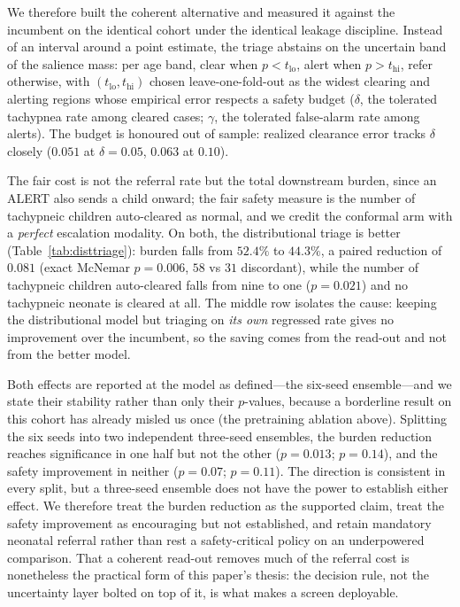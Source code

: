 We therefore built the coherent alternative and measured it against the incumbent on the identical
cohort under the identical leakage discipline. Instead of an interval around a point estimate, the
triage abstains on the uncertain band of the salience mass: per age band, clear when $p<t_\text{lo}$,
alert when $p>t_\text{hi}$, refer otherwise, with $(t_\text{lo},t_\text{hi})$ chosen leave-one-fold-out
as the widest clearing and alerting regions whose empirical error respects a safety budget ($\delta$, the
tolerated tachypnea rate among cleared cases; $\gamma$, the tolerated false-alarm rate among alerts).
The budget is honoured out of sample: realized clearance error tracks $\delta$ closely
($0.051$ at $\delta{=}0.05$, $0.063$ at $0.10$).

The fair cost is not the referral rate but the total downstream burden, since an ALERT also sends a
child onward; the fair safety measure is the number of tachypneic children auto-cleared as normal, and
we credit the conformal arm with a \emph{perfect} escalation modality. On both, the distributional
triage is better (Table~\ref{tab:disttriage}): burden falls from $52.4\%$ to $44.3\%$, a paired
reduction of $0.081$ (exact McNemar $p=0.006$, $58$ vs $31$ discordant), while the number of
tachypneic children auto-cleared falls from nine to one ($p=0.021$) and no tachypneic neonate is
cleared at all. The middle row isolates the cause: keeping the distributional model but triaging on
\emph{its own} regressed rate gives no improvement over the incumbent, so the saving comes from the
read-out and not from the better model.

Both effects are reported at the model as defined---the six-seed ensemble---and we state their
stability rather than only their $p$-values, because a borderline result on this cohort has already
misled us once (the pretraining ablation above). Splitting the six seeds into two independent
three-seed ensembles, the burden reduction reaches significance in one half but not the other
($p=0.013$; $p=0.14$), and the safety improvement in neither ($p=0.07$; $p=0.11$). The direction is
consistent in every split, but a three-seed ensemble does not have the power to establish either
effect. We therefore treat the burden reduction as the supported claim, treat the safety improvement
as encouraging but not established, and retain mandatory neonatal referral rather than rest a
safety-critical policy on an underpowered comparison. That a coherent read-out removes much of the
referral cost is nonetheless the practical form of this paper's thesis: the decision rule, not the
uncertainty layer bolted on top of it, is what makes a screen deployable.

